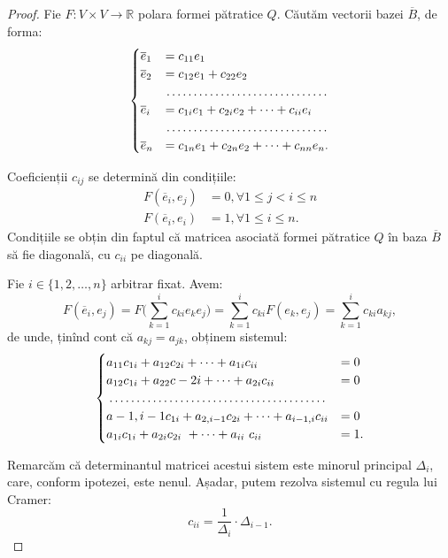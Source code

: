 \documentclass[11pt,a4paper]{article}
\theoremstyle{dotless}
\theoremstyle{dotlessdr}
\begin{document}
\begin{proof}
	Fie $F : V \times V \to \mathbb{R}$ polara formei pătratice $Q$. Căutăm
vectorii bazei $\overline{B}$, de forma:
\begin{equation}
    \label{equation:sistem-coef-jacobi}
	\begin{cases}	
	    \overline{e}_1 &= c_{11} e_1 \\
	    \overline{e}_2 &= c_{12} e_1 + c_{22}e_2 \\
	    & \dotfill \\
	    \overline{e}_i &= c_{1i}e_1 + c_{2i} e_2 + \dots + c_{ii}e_i \\
	    & \dotfill \\
	    \overline{e}_n &= c_{1n}e_1 + c_{2n} e_2 + \dots + c_{nn} e_n.
    \end{cases}
\end{equation}

Coeficienții $c_{ij}$ se determină din condițiile:
\begin{align*}
	F(\overline{e}_i, e_j) &= 0, \forall 1 \leq j < i \leq n \\
	F(\overline{e}_i, e_i) &= 1, \forall 1 \leq i \leq n.
\end{align*}
Condițiile se obțin din faptul că matricea asociată formei pătratice $Q$ în
baza $\overline{B}$ să fie diagonală, cu $c_{ii}$ pe diagonală.

Fie $i \in \{1, 2, \dots, n\}$ arbitrar fixat. Avem: 
 \[
	F(\overline{e}_i, e_j) = F \Big( \sum_{k = 1}^i c_{ki} e_k e_j \Big) =
	                         \sum_{k = 1}^i c_{ki} F(e_k, e_j) =
	                         \sum_{k = 1}^i c_{ki} a_{kj},
\]
de unde, ținînd cont că $a_{kj} = a_{jk}$, obținem sistemul: 
 \[
	\begin{cases}	
	    a_{11} c_{1i} + a_{12} c_{2i} + \dots + a_{1i} c_{ii} &= 0 \\
	    a_{12} c_{1i} + a_{22} c-{2i} + \dots + a_{2i} c_{ii} &= 0 \\
	    \dotfill \\
	    a-{1, i-1} c_{1i} + a_{2, i-1}c_{2i} + \dots + a_{i-1, i} c_{ii} &= 0 \\
	    a_{1i} c_{1i} + a_{2i} c_{2i} + \dots + a_{ii} c_{ii} &= 1.
    \end{cases}
\]

Remarcăm că determinantul matricei acestui sistem este minorul principal
$\Delta_i$, care, conform ipotezei, este nenul. Așadar, putem rezolva sistemul
cu regula lui Cramer: 
 \[
	c_{ii} = \dfrac{1}{\Delta_i} \cdot \Delta_{i-1}.
\]


\end{proof}
\end{document}
